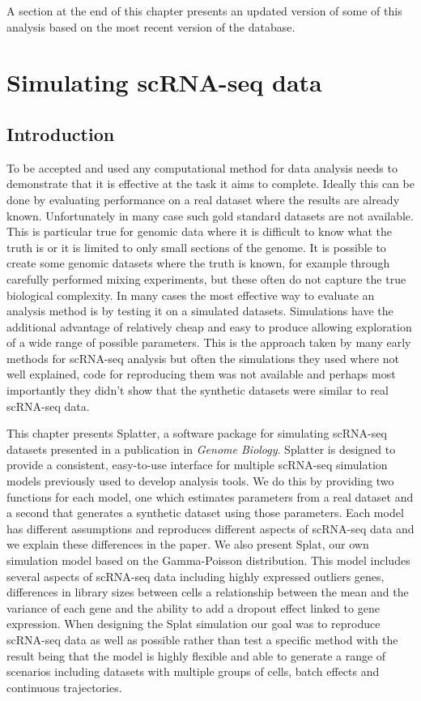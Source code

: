 \documentclass[11pt,a4paper,titlepage,twoside,openright]{style/unimelbthesis}
\theoremstyle{definition}
\theoremstyle{definition}
\theoremstyle{definition}
\theoremstyle{remark}
\begin{document}
\begin{mainmatter}
A section at the end of this chapter presents an updated version of some of this analysis based on the most recent version of the database.

\hypertarget{simulating-scrna-seq-data}{%
\chapter{Simulating scRNA-seq data}\label{simulating-scrna-seq-data}}

\hypertarget{introduction-2}{%
\section{Introduction}\label{introduction-2}}

To be accepted and used any computational method for data analysis needs to demonstrate that it is effective at the task it aims to complete. Ideally this can be done by evaluating performance on a real dataset where the results are already known. Unfortunately in many case such gold standard datasets are not available. This is particular true for genomic data where it is difficult to know what the truth is or it is limited to only small sections of the genome. It is possible to create some genomic datasets where the truth is known, for example through carefully performed mixing experiments, but these often do not capture the true biological complexity. In many cases the most effective way to evaluate an analysis method is by testing it on a simulated datasets. Simulations have the additional advantage of relatively cheap and easy to produce allowing exploration of a wide range of possible parameters. This is the approach taken by many early methods for scRNA-seq analysis but often the simulations they used where not well explained, code for reproducing them was not available and perhaps most importantly they didn't show that the synthetic datasets were similar to real scRNA-seq data.

This chapter presents Splatter, a software package for simulating scRNA-seq datasets presented in a publication in \emph{Genome Biology}. Splatter is designed to provide a consistent, easy-to-use interface for multiple scRNA-seq simulation models previously used to develop analysis tools. We do this by providing two functions for each model, one which estimates parameters from a real dataset and a second that generates a synthetic dataset using those parameters. Each model has different assumptions and reproduces different aspects of scRNA-seq data and we explain these differences in the paper. We also present Splat, our own simulation model based on the Gamma-Poisson distribution. This model includes several aspects of scRNA-seq data including highly expressed outliers genes, differences in library sizes between cells a relationship between the mean and the variance of each gene and the ability to add a dropout effect linked to gene expression. When designing the Splat simulation our goal was to reproduce scRNA-seq data as well as possible rather than test a specific method with the result being that the model is highly flexible and able to generate a range of scenarios including datasets with multiple groups of cells, batch effects and continuous trajectories.


\end{mainmatter}
\end{document}
